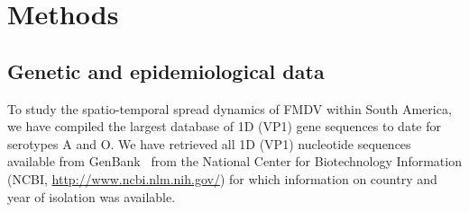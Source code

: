\documentclass[10pt]{article}
\begin{document}
% 

\section*{Methods}

\subsection*{Genetic and epidemiological data}

To study the spatio-temporal spread dynamics of FMDV within South America, we have compiled the largest database of 1D (VP1) gene sequences to date for serotypes A and O.
We have retrieved all 1D (VP1) nucleotide sequences available from GenBank~\citep{Benson2013} from the National Center for Biotechnology Information (NCBI, \url{ http://www.ncbi.nlm.nih.gov/}) for which information on country and year of isolation was available.
\end{document}

